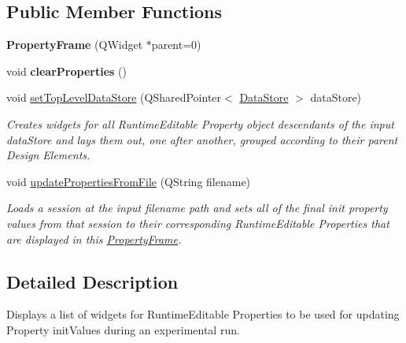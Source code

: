 \subsection*{Public Member Functions}
\begin{DoxyCompactItemize}
\item 
\hypertarget{class_property_frame_adb615257989f95de888b3860e1f7dab0}{{\bfseries Property\-Frame} (Q\-Widget $\ast$parent=0)}\label{class_property_frame_adb615257989f95de888b3860e1f7dab0}

\item 
\hypertarget{class_property_frame_a7e62c3ad930ed1a5e8fca2f813c87d98}{void {\bfseries clear\-Properties} ()}\label{class_property_frame_a7e62c3ad930ed1a5e8fca2f813c87d98}

\item 
void \hyperlink{class_property_frame_a0587e762fdab49d10d8507fc60fa9ff0}{set\-Top\-Level\-Data\-Store} (Q\-Shared\-Pointer$<$ \hyperlink{class_picto_1_1_data_store}{Data\-Store} $>$ data\-Store)
\begin{DoxyCompactList}\small\item\em Creates widgets for all Runtime\-Editable Property object descendants of the input data\-Store and lays them out, one after another, grouped according to their parent Design Elements. \end{DoxyCompactList}\item 
void \hyperlink{class_property_frame_a8daea01e3537d392421270edfe6d71f8}{update\-Properties\-From\-File} (Q\-String filename)
\begin{DoxyCompactList}\small\item\em Loads a session at the input filename path and sets all of the final init property values from that session to their corresponding Runtime\-Editable Properties that are displayed in this \hyperlink{class_property_frame}{Property\-Frame}. \end{DoxyCompactList}\end{DoxyCompactItemize}


\subsection{Detailed Description}
Displays a list of widgets for Runtime\-Editable Properties to be used for updating Property init\-Values during an experimental run. 

